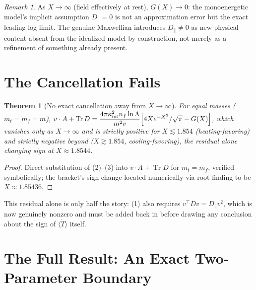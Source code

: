 \documentclass[12pt]{amsart}
\theoremstyle{plain}
\newtheorem{theorem}{Theorem}[section]
\theoremstyle{remark}
\newtheorem*{remark}{Remark}
\begin{document}
\begin{remark}
As $X\to\infty$ (field effectively at rest), $G(X)\to0$: the monoenergetic model's implicit assumption $D_\parallel=0$ is not an approximation error but the exact leading-log limit. The genuine Maxwellian introduces $D_\parallel\neq0$ as new physical content absent from the idealized model by construction, not merely as a refinement of something already present.
\end{remark}

\section{The Cancellation Fails}

\begin{theorem}[No exact cancellation away from $X\to\infty$]\label{thm:nocancel}
For equal masses ($m_t=m_f=m$), $v\cdot A+\operatorname{Tr}D = \dfrac{4\pi\kappa_{\rm int}^2n_f\ln\Lambda}{m^2v}\Big[4Xe^{-X^2}/\sqrt\pi - G(X)\Big]$, which vanishes only as $X\to\infty$ and is strictly positive for $X\lesssim1.854$ (heating-favoring) and strictly negative beyond ($X\gtrsim1.854$, cooling-favoring), the residual alone changing sign at $X\approx1.8544$.
\end{theorem}

\begin{proof}
Direct substitution of (2)--(3) into $v\cdot A+\operatorname{Tr}D$ for $m_t=m_f$, verified symbolically; the bracket's sign change located numerically via root-finding to be $X\approx1.85436$.
\end{proof}

This residual alone is only half the story: (1) also requires $v^\top Dv=D_\parallel v^2$, which is now genuinely nonzero and must be added back in before drawing any conclusion about the sign of $\langle\dot T\rangle$ itself.

\section{The Full Result: An Exact Two-Parameter Boundary}
\end{document}
